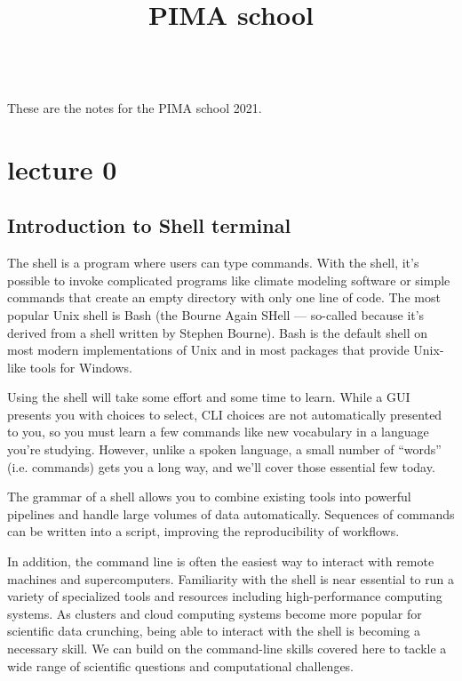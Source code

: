 \documentclass[11pt]{book}
\begin{document}
\title{PIMA school}

\maketitle

\frontmatter
\tableofcontents
\mainmatter

~\\
These are the notes for the PIMA school 2021.



\chapter{lecture 0}

\section{Introduction to Shell terminal}
The shell is a program where users can type commands. With the shell, it’s possible to invoke complicated programs like climate modeling software or simple commands that create an empty directory with only one line of code. The most popular Unix shell is Bash (the Bourne Again SHell — so-called because it’s derived from a shell written by Stephen Bourne). Bash is the default shell on most modern implementations of Unix and in most packages that provide Unix-like tools for Windows.

Using the shell will take some effort and some time to learn. While a GUI presents you with choices to select, CLI choices are not automatically presented to you, so you must learn a few commands like new vocabulary in a language you’re studying. However, unlike a spoken language, a small number of “words” (i.e. commands) gets you a long way, and we’ll cover those essential few today.

The grammar of a shell allows you to combine existing tools into powerful pipelines and handle large volumes of data automatically. Sequences of commands can be written into a script, improving the reproducibility of workflows.

In addition, the command line is often the easiest way to interact with remote machines and supercomputers. Familiarity with the shell is near essential to run a variety of specialized tools and resources including high-performance computing systems. As clusters and cloud computing systems become more popular for scientific data crunching, being able to interact with the shell is becoming a necessary skill. We can build on the command-line skills covered here to tackle a wide range of scientific questions and computational challenges.
\end{document}
